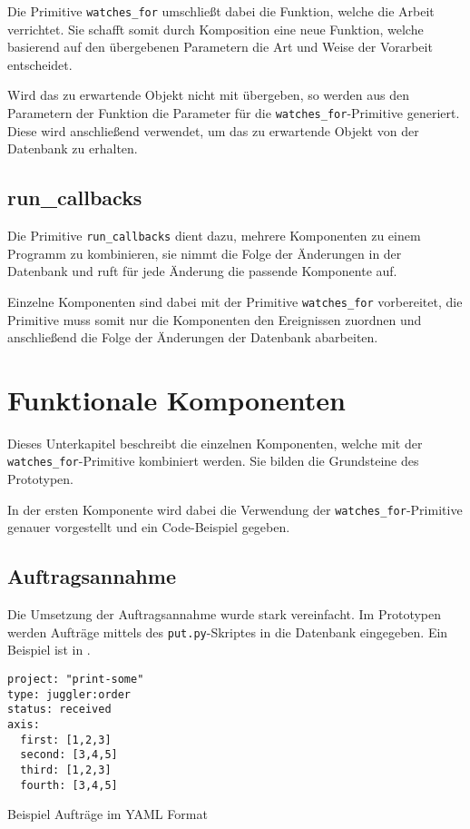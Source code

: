 Die Primitive \verb|watches_for| umschließt dabei die Funktion,
welche die Arbeit verrichtet. Sie schafft somit durch Komposition eine neue Funktion,
welche basierend auf den übergebenen Parametern die Art und Weise der Vorarbeit entscheidet.

Wird das zu erwartende Objekt nicht mit übergeben, so werden aus den Parametern der Funktion die Parameter für die \verb|watches_for|-Primitive generiert.
Diese wird anschließend verwendet, um das zu erwartende Objekt von der Datenbank zu erhalten.



\subsection{run\_callbacks}

Die Primitive \verb|run_callbacks| dient dazu, mehrere Komponenten zu einem Programm
zu kombinieren, sie nimmt die Folge der Änderungen in der Datenbank und
ruft für jede Änderung die passende Komponente auf.

Einzelne Komponenten sind dabei mit der Primitive \verb|watches_for| vorbereitet,
die Primitive muss somit nur die Komponenten den Ereignissen zuordnen
und anschließend die Folge der Änderungen der Datenbank abarbeiten.

\section{Funktionale Komponenten}

Dieses Unterkapitel beschreibt die einzelnen Komponenten,
welche mit der \verb|watches_for|-Primitive kombiniert werden.
Sie bilden die Grundsteine des Prototypen.

In der ersten Komponente wird dabei die Verwendung der \verb|watches_for|-Primitive genauer vorgestellt und ein Code-Beispiel gegeben.

\subsection{Auftragsannahme}

Die Umsetzung der Auftragsannahme wurde stark vereinfacht.
Im Prototypen werden Aufträge mittels des \verb|put.py|-Skriptes in die Datenbank eingegeben.
Ein Beispiel ist in .

\begin{listing}[h]
\begin{verbatim}
project: "print-some"
type: juggler:order
status: received
axis:
  first: [1,2,3]
  second: [3,4,5]
  third: [1,2,3]
  fourth: [3,4,5]
\end{verbatim}
\caption{Beispiel Auftr\"age im YAML Format}
\label{fig:auftrag-beispieldaten}
\end{listing}

